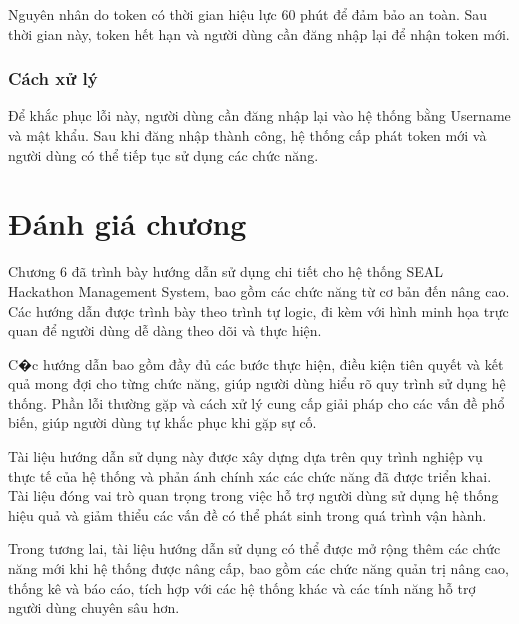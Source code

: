 Nguyên nhân do token có thời gian hiệu lực 60 phút để đảm bảo an toàn. Sau thời gian này, token hết hạn và người dùng cần đăng nhập lại để nhận token mới.

\subsubsection{Cách xử lý}

Để khắc phục lỗi này, người dùng cần đăng nhập lại vào hệ thống bằng Username và mật khẩu. Sau khi đăng nhập thành công, hệ thống cấp phát token mới và người dùng có thể tiếp tục sử dụng các chức năng.


\section{Đánh giá chương}

Chương 6 đã trình bày hướng dẫn sử dụng chi tiết cho hệ thống SEAL Hackathon Management System, bao gồm các chức năng từ cơ bản đến nâng cao. Các hướng dẫn được trình bày theo trình tự logic, đi kèm với hình minh họa trực quan để người dùng dễ dàng theo dõi và thực hiện.

C�c hướng dẫn bao gồm đầy đủ các bước thực hiện, điều kiện tiên quyết và kết quả mong đợi cho từng chức năng, giúp người dùng hiểu rõ quy trình sử dụng hệ thống. Phần lỗi thường gặp và cách xử lý cung cấp giải pháp cho các vấn đề phổ biến, giúp người dùng tự khắc phục khi gặp sự cố.

Tài liệu hướng dẫn sử dụng này được xây dựng dựa trên quy trình nghiệp vụ thực tế của hệ thống và phản ánh chính xác các chức năng đã được triển khai. Tài liệu đóng vai trò quan trọng trong việc hỗ trợ người dùng sử dụng hệ thống hiệu quả và giảm thiểu các vấn đề có thể phát sinh trong quá trình vận hành.

Trong tương lai, tài liệu hướng dẫn sử dụng có thể được mở rộng thêm các chức năng mới khi hệ thống được nâng cấp, bao gồm các chức năng quản trị nâng cao, thống kê và báo cáo, tích hợp với các hệ thống khác và các tính năng hỗ trợ người dùng chuyên sâu hơn.
